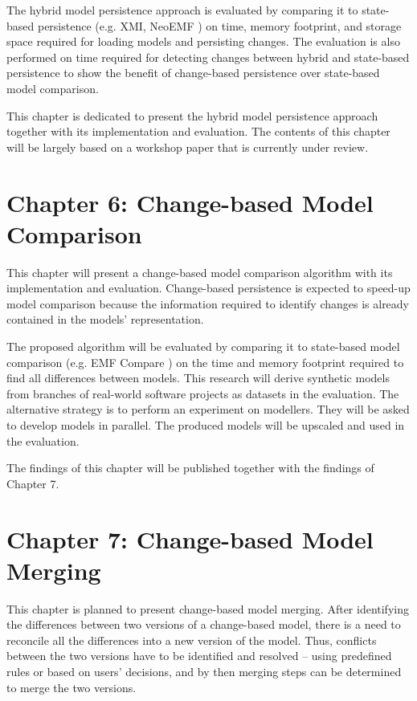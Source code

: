 \documentclass[12pt, a4paper]{report} \usepackage[titletoc]{appendix}
\begin{document}
The hybrid model persistence approach is evaluated by comparing it to state-based persistence (e.g. XMI, NeoEMF \cite{daniel2016neoemf}) on time, memory footprint, and storage space required for loading models and persisting changes. The evaluation is also performed on time required for detecting changes between hybrid and state-based persistence to show the benefit of change-based persistence over state-based model comparison. 

This chapter is dedicated to present the hybrid model persistence approach together with its implementation and evaluation. The contents of this chapter will be largely based on a workshop paper \cite{DBLP:conf/models/YohannisRPK18} that is currently under review. 

\section{Chapter 6: Change-based Model Comparison}
\label{sec:chapter_6_change_based_model_comparison}
This chapter will present a change-based model comparison algorithm with its implementation and evaluation. Change-based persistence is expected to speed-up model comparison because the information required to identify changes is already contained in the models' representation. 

The proposed algorithm will be evaluated by comparing it to state-based model comparison (e.g. EMF Compare \cite{eclipse2017compare}) on the time and memory footprint required to find all differences between models. This research will derive synthetic models from branches of real-world software projects as datasets in the evaluation. The alternative strategy is to perform an experiment on modellers. They will be asked to develop models in parallel. The produced models will be upscaled and used in the evaluation. 

The findings of this chapter will be published together with the findings of Chapter 7.


\section{Chapter 7: Change-based Model Merging}
\label{sec:chapter_7_change_based_model_Merging}
This chapter is planned to present change-based model merging. After identifying the differences between two versions of a change-based model, there is a need to reconcile all the differences into a new version of the model. Thus, conflicts between the two versions have to be identified and resolved -- using predefined rules or based on users' decisions, and by then merging steps can be determined to merge the two versions. 
\end{document}
